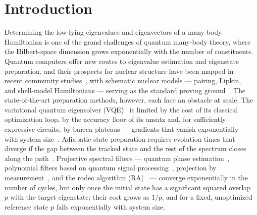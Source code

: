 \documentclass[
  aps,            %
  prc,            %
  reprint,        %
  superscriptaddress,
  floatfix,
  nofootinbib
]{revtex4-2}
\begin{document}
\section{Introduction}
Determining the low-lying eigenvalues and eigenvectors of a many-body Hamiltonian is
one of the grand challenges of quantum many-body theory, where the Hilbert-space
dimension grows exponentially with the number of constituents.  Quantum computers
offer new routes to eigenvalue estimation and eigenstate preparation, and their
prospects for nuclear structure have been mapped in recent community
studies~\cite{Beck2023,Bauer2023,LeeReview2023}, with schematic nuclear models ---
pairing, Lipkin, and shell-model Hamiltonians --- serving as the standard proving
ground~\cite{Ovrum2007,Hlatshwayo2022,Stetcu2022,PerezObiol2023,Jiang2023,Zhang2024,Lacroix2023}.
The state-of-the-art preparation methods, however, each face an obstacle at scale.
The variational quantum eigensolver (VQE)~\cite{Peruzzo2014} is limited by the cost
of its classical optimization loop, by the accuracy floor of its ansatz and, for
sufficiently expressive circuits, by barren plateaus --- gradients that vanish
exponentially with system size~\cite{McClean2018,Larocca2025}.  Adiabatic state
preparation requires evolution times that diverge if the gap between the tracked
state and the rest of the spectrum closes along the path~\cite{Albash2018}.
Projective spectral filters --- quantum phase estimation~\cite{Abrams1999},
polynomial filters based on quantum signal processing~\cite{LinTong2020,Dong2022},
projection by measurement~\cite{Stetcu2023}, and the rodeo algorithm
(RA)~\cite{Choi2021,Qian2024,Cohen2023,BeeLindgren2022,Patkowski2026} --- converge
exponentially in the number of cycles, but only once the initial state has a
significant squared overlap $p$ with the target eigenstate; their cost grows as
$1/p$, and for a fixed, unoptimized reference state $p$ falls exponentially with
system size.
\end{document}
